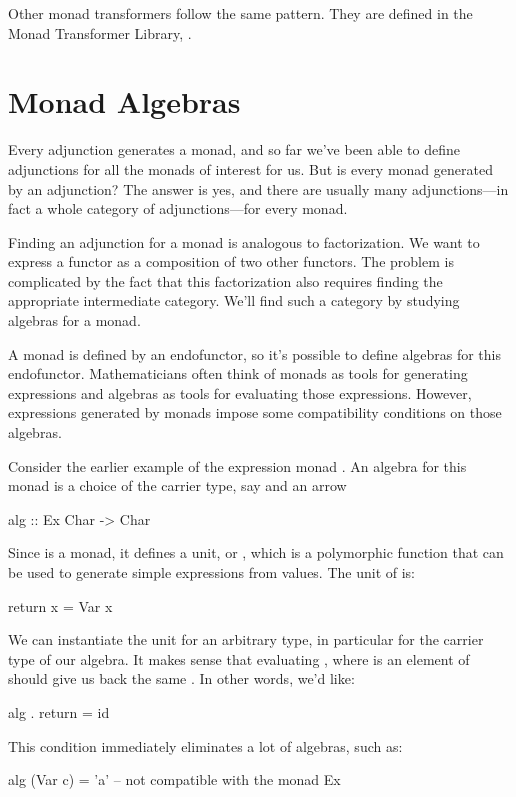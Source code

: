 \documentclass[DaoFP]{subfiles}
\begin{document}
Other monad transformers follow the same pattern. They are defined in the Monad Transformer Library, .

\section{Monad Algebras}

Every adjunction generates a monad, and so far we've been able to define adjunctions for all the monads of interest for us. But is every monad generated by an adjunction? The answer is yes, and there are usually many adjunctions---in fact a whole category of adjunctions---for every monad.

Finding an adjunction for a monad is analogous to factorization. We want to express a functor as a composition of two other functors. The problem is complicated by the fact that this factorization also requires finding the appropriate intermediate category. We'll find such a category by studying algebras for a monad.

A monad is defined by an endofunctor, so it's possible to define algebras for this endofunctor. Mathematicians often think of monads as tools for generating expressions and algebras as tools for evaluating those expressions. However, expressions generated by monads impose some compatibility conditions on those algebras. 

Consider the earlier example of the expression monad . An algebra for this monad is a choice of the carrier type, say  and an arrow
\begin{haskell}
alg :: Ex Char -> Char
\end{haskell}
Since  is a monad, it defines a unit, or , which is a polymorphic function that can be used to generate simple expressions from values. The unit of  is:
\begin{haskell}
return x = Var x
\end{haskell}
We can instantiate the unit for an arbitrary type, in particular for the carrier type of our algebra. It makes sense that evaluating , where  is an element of  should give us back the same . In other words, we'd like:
\begin{haskell}
 alg . return = id
\end{haskell}
This condition immediately eliminates a lot of algebras, such as:
\begin{haskell}
alg (Var c) = 'a' -- not compatible with the monad Ex
\end{haskell}
\end{document}
